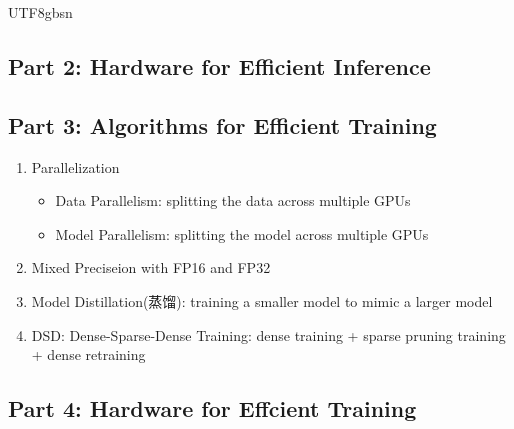 \documentclass{article}
\numberwithin{equation}{section}
\begin{document}
\begin{CJK}{UTF8}{gbsn}
\subsection{Part 2: Hardware for Efficient Inference}
\subsection{Part 3: Algorithms for Efficient Training}
\begin{enumerate}
    \item Parallelization\par
    \begin{itemize}
        \item Data Parallelism: splitting the data across multiple GPUs
        \item Model Parallelism: splitting the model across multiple GPUs
    \end{itemize}
    \item Mixed Preciseion with FP16 and FP32
    \item Model Distillation(蒸馏): training a smaller model to mimic a larger model
    \item DSD: Dense-Sparse-Dense Training: dense training + sparse pruning training + dense retraining
\end{enumerate}

\subsection{Part 4: Hardware for Effcient Training}

\end{CJK}
\end{document}
